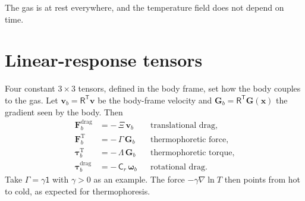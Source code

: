 \documentclass[11pt]{article}
\newcommand{\vect}[1]{\bm{#1}}
\newcommand{\tens}[1]{\mathsf{#1}}
\newcommand{\Rm}{\tens{R}}
\newcommand{\Gl}{\vect{G}}
\newcommand{\Gb}{\vect{G}_{b}}
\newcommand{\T}{^{\mathsf{T}}}
\theoremstyle{remark}
\begin{document}
The gas is at rest everywhere, and the temperature field does not depend
on time.

\section{Linear-response tensors}
\label{sec:tensors}

Four constant $3\times3$ tensors, defined in the body frame, set how the
body couples to the gas. Let $\vect{v}_b=\Rm\T\vect{v}$ be the body-frame
velocity and $\Gb=\Rm\T\Gl(\vect{x})$ the gradient seen by the body. Then
\begin{align}
  \vect{F}_b^{\text{drag}} &= -\,\tens{\Xi}\,\vect{v}_b
      && \text{translational drag,}\\
  \vect{F}_b^{\text{T}}    &= -\,\tens{\Gamma}\,\Gb
      && \text{thermophoretic force,}\\
  \vect{\tau}_b^{\text{T}} &= -\,\tens{\Lambda}\,\Gb
      && \text{thermophoretic torque,}\\
  \vect{\tau}_b^{\text{drag}} &= -\,\tens{C}_r\,\vect{\omega}_b
      && \text{rotational drag.}
\end{align}
Take $\tens{\Gamma}=\gamma\tens{1}$ with $\gamma>0$ as an example. The force
$-\gamma\nabla\ln T$ then points from hot to cold, as expected for
thermophoresis.
\end{document}
